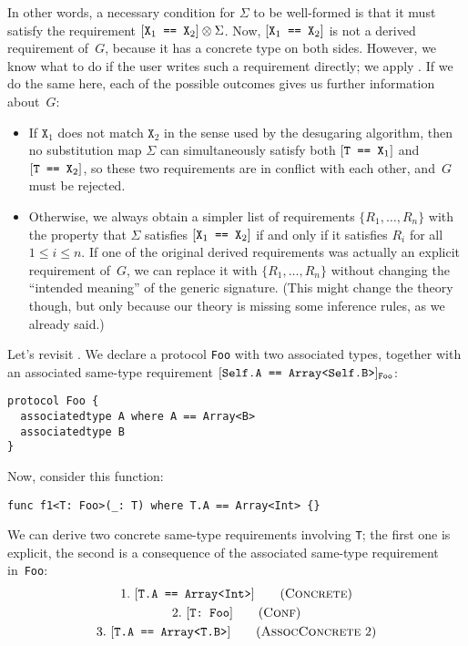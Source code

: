 \documentclass[../generics]{subfiles}
\begin{document}
In other words, a necessary condition for $\Sigma$ to be well-formed is that it must satisfy the requirement $[\texttt{$\texttt{X}_1$ == $\texttt{X}_2$}]\otimes\Sigma$. Now, $[\texttt{$\texttt{X}_1$ == $\texttt{X}_2$}]$ is not a derived requirement of~$G$, because it has a concrete type on both sides. However, we know what to do if the user writes such a requirement directly; we apply . If we do the same here, each of the possible outcomes gives us further information about~$G$:
\begin{itemize}
\item If $\texttt{X}_1$ does not match $\texttt{X}_2$ in the sense used by the desugaring algorithm, then no substitution map $\Sigma$ can simultaneously satisfy both $[\texttt{T == $\texttt{X}_1$}]$ and $[\texttt{T == $\texttt{X}_2$}]$, so these two requirements are in conflict with each other, and~$G$ must be rejected.

\item Otherwise, we always obtain a simpler list of requirements $\{R_1,\ldots,R_n\}$ with the property that $\Sigma$ satisfies $[\texttt{$\texttt{X}_1$ == $\texttt{X}_2$}]$ if and only if it satisfies $R_i$ for all $1\le i\le n$. If one of the original derived requirements was actually an explicit requirement of~$G$, we can replace it with $\{R_1,\ldots,R_n\}$ without changing the ``intended meaning'' of the generic signature. (This might change the theory though, but only because our theory is missing some inference rules, as we already said.)
\end{itemize}
Let's revisit . We declare a protocol \texttt{Foo} with two associated types, together with an associated same-type requirement $[\texttt{Self.A == Array<Self.B>}]_\texttt{Foo}$:
\begin{Verbatim}
protocol Foo {
  associatedtype A where A == Array<B>
  associatedtype B
}
\end{Verbatim}
Now, consider this function:
\begin{Verbatim}
func f1<T: Foo>(_: T) where T.A == Array<Int> {}
\end{Verbatim}
We can derive two concrete same-type requirements involving \texttt{T}; the first one is explicit, the second is a consequence of the associated same-type requirement in~\texttt{Foo}:
\begin{gather*}
\ConcreteStep{T.A}{Array<Int>}{1}\\
\ConfStep{T}{Foo}{2}\\
\AssocConcreteStep{2}{T.A}{Array<T.B>}{3}
\end{gather*}
\end{document}
